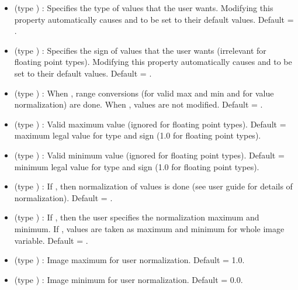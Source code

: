 \documentclass{article}
\begin{document}
\begin{itemize}

\item {} (type ) : Specifies the type
of values that the user wants. Modifying this property automatically
causes  and  to
be set to their default values. Default = .

\item {} (type ) :  Specifies the sign of
values that the user wants (irrelevant for floating point types).
Modifying this property automatically causes
 and  to be set to
their default values. Default = .

\item {} (type ) : When ,
range conversions (for valid max and min and for value normalization)
are done. When , values are not modified. Default =
.

\item {} (type ) : Valid maximum
value (ignored for floating point types). Default = maximum legal
value for type and sign (1.0 for floating point types).

\item {} (type ) : Valid minimum
value (ignored for floating point types). Default = minimum legal
value for type and sign (1.0 for floating point types).

\item {} (type ) : If ,
then normalization of values is done (see user guide for details of
normalization). Default = .

\item {} (type ) : If ,
then the user specifies the normalization maximum and minimum. If
, values are taken as maximum and minimum for whole image
variable. Default = .

\item {} (type ) : Image maximum
for user normalization. Default = 1.0.

\item {} (type ) : Image minimum
for user normalization. Default = 0.0.


\end{itemize}
\end{document}
